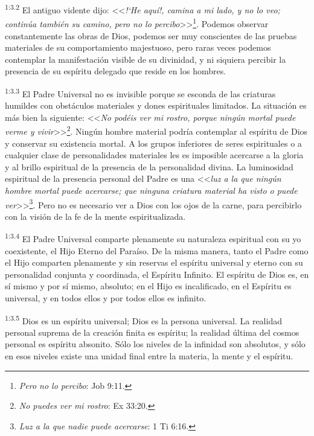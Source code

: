 \par
\textsuperscript{1:3.2} El antiguo vidente dijo: <<\textit{!`He aquí!, camina a mi lado, y no lo veo; continúa también su camino, pero no lo percibo}>>\footnote{\textit{Pero no lo percibo}: Job 9:11.}. Podemos observar constantemente las obras de Dios, podemos ser muy conscientes de las pruebas materiales de su comportamiento majestuoso, pero raras veces podemos contemplar la manifestación visible de su divinidad, y ni siquiera percibir la presencia de su espíritu delegado que reside en los hombres.

\par
\textsuperscript{1:3.3} El Padre Universal no es invisible porque se esconda de las criaturas humildes con obstáculos materiales y dones espirituales limitados. La situación es más bien la siguiente: <<\textit{No podéis ver mi rostro, porque ningún mortal puede verme y vivir}>>\footnote{\textit{No puedes ver mi rostro}: Ex 33:20.}. Ningún hombre material podría contemplar al espíritu de Dios y conservar su existencia mortal. A los grupos inferiores de seres espirituales o a cualquier clase de personalidades materiales les es imposible acercarse a la gloria y al brillo espiritual de la presencia de la personalidad divina. La luminosidad espiritual de la presencia personal del Padre es una <<\textit{luz a la que ningún hombre mortal puede acercarse; que ninguna criatura material ha visto o puede ver}>>\footnote{\textit{Luz a la que nadie puede acercarse}: 1 Ti 6:16.}. Pero no es necesario ver a Dios con los ojos de la carne, para percibirlo con la visión de la fe de la mente espiritualizada.

\par
\textsuperscript{1:3.4} El Padre Universal comparte plenamente su naturaleza espiritual con su yo coexistente, el Hijo Eterno del Paraíso. De la misma manera, tanto el Padre como el Hijo comparten plenamente y sin reservas el espíritu universal y eterno con su personalidad conjunta y coordinada, el Espíritu Infinito. El espíritu de Dios es, en sí mismo y por sí mismo, absoluto; en el Hijo es incalificado, en el Espíritu es universal, y en todos ellos y por todos ellos es infinito.

\par
\textsuperscript{1:3.5} Dios es un espíritu universal; Dios es la persona universal. La realidad personal suprema de la creación finita es espíritu; la realidad última del cosmos personal es espíritu absonito. Sólo los niveles de la infinidad son absolutos, y sólo en esos niveles existe una unidad final entre la materia, la mente y el espíritu.

